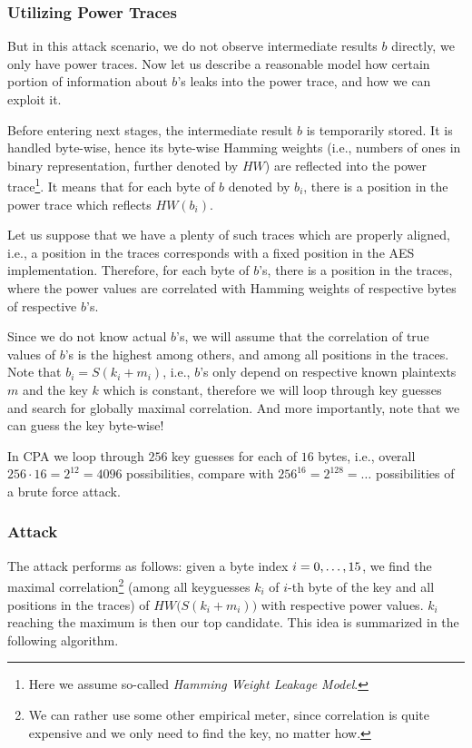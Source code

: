 \subsubsection{Utilizing Power Traces}
	
	But in this attack scenario, we do not observe intermediate results $b$ directly, we only have power traces. Now let us describe a reasonable model how certain portion of information about $b$'s leaks into the power trace, and how we can exploit it.
	
	Before entering next stages, the intermediate result $b$ is temporarily stored. It is handled byte-wise, hence its byte-wise Hamming weights (i.e., numbers of ones in binary representation, further denoted by $HW$) are reflected into the power trace\footnote{Here we assume so-called {\em Hamming Weight Leakage Model}.}. It means that for each byte of $b$ denoted by $b_i$, there is a position in the power trace which reflects $HW(b_i)$.
	
	Let us suppose that we have a plenty of such traces which are properly aligned, i.e., a position in the traces corresponds with a fixed position in the AES implementation. Therefore, for each byte of $b$'s, there is a position in the traces, where the power values are correlated with Hamming weights of respective bytes of respective $b$'s.
	
	Since we do not know actual $b$'s, we will assume that the correlation of true values of $b$'s is the highest among others, and among all positions in the traces. Note that $b_i = S(k_i+m_i)$, i.e., $b$'s only depend on respective known plaintexts $m$ and the key $k$ which is constant, therefore we will loop through key guesses and search for globally maximal correlation. And more importantly, note that we can guess the key byte-wise!
	
	\begin{note}
	\label{note:brutevssca}
		In CPA we loop through $256$ key guesses for each of $16$ bytes, i.e., overall $256\cdot 16 = 2^{12} = 4096$ possibilities, compare with $256^{16} = 2^{128} = \ldots$ possibilities of a brute force attack.
	\end{note}

\subsubsection{Attack}
	
	The attack performs as follows: given a byte index $i=0 , \ldots , 15$, we find the maximal correlation\footnote{We can rather use some other empirical meter, since correlation is quite expensive and we only need to find the key, no matter how.} (among all keyguesses $k_i$ of $i$-th byte of the key and all positions in the traces) of $HW\bigl(S(k_i+m_i)\bigr)$ with respective power values. $k_i$ reaching the maximum is then our top candidate. This idea is summarized in the following algorithm.
	
